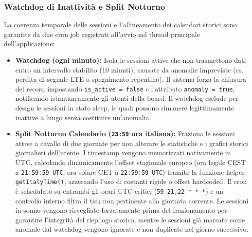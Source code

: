 \documentclass[12pt,a4paper]{article}
\begin{document}
\subsubsection{Watchdog di Inattività e Split Notturno}
La coerenza temporale delle sessioni e l'allineamento dei calendari storici sono garantite da due cron job registrati all'avvio nel thread principale dell'applicazione:
\begin{itemize}
    \item \textbf{Watchdog (ogni minuto):} Isola le sessioni attive che non trasmettono dati entro un intervallo stabilito (10 minuti), causate da anomalie impreviste (es. perdita di segnale LTE o spegnimento repentino). Il sistema forza la chiusura del record impostando \texttt{is\_active = false} e l'attributo \texttt{anomaly = true}, notificando istantaneamente gli utenti della board. Il watchdog esclude per design le sessioni in stato sleep, le quali possono rimanere legittimamente inattive a lungo senza costituire un'anomalia.    
    \item \textbf{Split Notturno Calendario (\texttt{23:59} ora italiana):} Fraziona le sessioni attive a cavallo di due giornate per non alterare le statistiche e i grafici storici giornalieri dell'utente. I timestamp vengono memorizzati nativamente in UTC, calcolando dinamicamente l'offset stagionale europeo (ora legale CEST a \texttt{21:59:59 UTC}, ora solare CET a \texttt{22:59:59 UTC}) tramite la funzione helper \texttt{getItalyTime()}, azzerando l'uso di costanti rigide o offset hardcoded. Il cron è schedulato su entrambi gli orari UTC critici (\texttt{59 21,22 * * *}) e un controllo interno filtra il tick non pertinente alla giornata corrente. Le sessioni in sonno vengono risvegliate forzatamente prima del frazionamento per garantire l'integrità del riepilogo storico, mentre le sessioni già marcate come anomale dal watchdog vengono ignorate e non duplicate nel giorno successivo.
\end{itemize}
\end{document}
